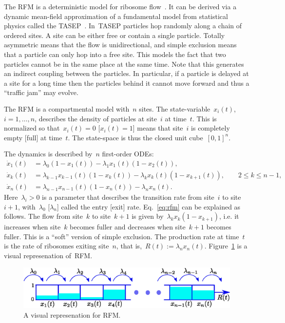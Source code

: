 The \ac{RFM}   is a deterministic model for ribosome  flow~\cite{reuveni2011genome}.
It can be derived via a  dynamic mean-field approximation of a fundamental model from statistical physics called the \ac{TASEP}~\cite{TASEP_tutorial_2011, solvers_guide}.  
In~\ac{TASEP} particles hop randomly along a chain of ordered sites. 
A site can be either   free or contain a single particle.
Totally asymmetric means that the flow is unidirectional, and simple exclusion means that a particle can only hop into a free site. 
This models the fact that two particles cannot be in the same place at the same time. 
Note that this generates an indirect coupling between the particles. 
In particular, if a particle is delayed at a site for a long time then the particles behind it cannot move forward and thus a ``traffic jam'' may evolve. 

The \ac{RFM} is a compartmental model with~$n$ sites.
The state-variable~$x_i(t)$, $i=1,\dots,n$, describes the density of particles at site~$i$ at time~$t$. 
This is normalized so that~$x_i(t)=0$ [$x_i(t)=1$] means that site~$i$ is completely empty [full] at time~$t$. 
The state-space is thus the closed unit cube~$[0,1]^n$. 

The dynamics is described by~$n$ first-order ODEs:
\begin{subequations} \label{eq:rfm}
	\begin{align}
		\dot x_1(t) &= \lambda_0 (1-x_1(t))  - \lambda_1 x_1(t) (1-x_2(t)), \\
		\dot x_k(t) &= \lambda_{k-1} x_{k-1}(t) (1-x_k(t))  - 
			\lambda_k x_k(t) (1-x_{k+1}(t)), \qquad 2\leq k \leq n-1, \\
		\dot x_n(t) &= \lambda_{n-1} x_{n-1}(t) (1-x_n(t))  - \lambda_n x_n(t).
	\end{align}
\end{subequations}
Here~$\lambda_i>0$ is a parameter that describes the transition  rate from site~$i$ to site~$i+1$, with~$\lambda_0$ [$\lambda_n$] called the entry [exit] rate. 
Eq.~\eqref{eq:rfm} can be explained as follows. 
The flow from site~$k$ to site~$k+1$ is given by~$\lambda_k x_k  (1-x_{k+1} )$, i.e. it increases when site~$k$ becomes fuller and decreases when site~$k+1$ becomes fuller. 
This is a ``soft'' version of simple exclusion. 
The production rate   at time~$t$ is the rate of ribosomes exiting site~$n$, that is,~$R(t):= \lambda_n x_n(t)$. 
Figure~\ref{fig:rfm} is a visual represenation of~\ac{RFM}.
\begin{figure}[t!]
	\centering
	\includegraphics[width=.8\linewidth]{fig/rfm-diagram-hist.eps}
	\caption[Ribosome flow model]{A visual represenation for \acf{RFM}.}
	\label{fig:rfm}
\end{figure}

